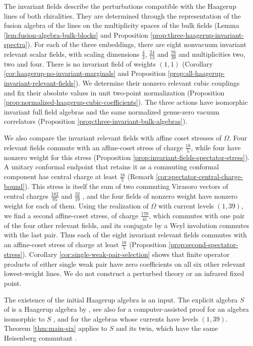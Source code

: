 \documentclass[leqno]{article}
\numberwithin{equation}{section}
\begin{document}
The invariant fields describe the perturbations compatible with the Haagerup lines of both chiralities. They are determined through the representation of the fusion algebra of the lines on the multiplicity spaces of the bulk fields (Lemma \ref{lem:fusion-algebra-bulk-blocks} and Proposition \ref{prop:three-haagerup-invariant-spectra}). For each of the three embeddings, there are eight nonvacuum invariant relevant scalar fields, with scaling dimensions $\frac43$, $\frac{24}{13}$ and $\frac{76}{39}$ and multiplicities two, two and four. There is no invariant field of weights $(1,1)$ (Corollary \ref{cor:haagerup-no-invariant-marginals} and Proposition \ref{prop:all-haagerup-invariant-relevant-fields}). We determine their nonzero relevant cubic couplings and fix their absolute values in unit two-point normalization (Proposition \ref{prop:normalized-haagerup-cubic-coefficients}). The three actions have isomorphic invariant full field algebras and the same normalized genus-zero vacuum correlators (Proposition \ref{prop:three-invariant-bulk-algebras}).

We also compare the invariant relevant fields with affine coset stresses of $\Omega$. Four relevant fields commute with an affine-coset stress of charge $\frac{18}{5}$, while four have nonzero weight for this stress (Proposition \ref{prop:invariant-fields-spectator-stress}). A unitary conformal endpoint that retains it as a commuting conformal component has central charge at least $\frac{18}{5}$ (Remark \ref{cor:spectator-central-charge-bound}). This stress is itself the sum of two commuting Virasoro vectors of central charges $\frac{182}{95}$ and $\frac{32}{19}$ \cite[Theorem 10.5 p.~30]{Arh26a}, and the four fields of nonzero weight have nonzero weight for each of them. Using the realization of $\Omega$ with current levels $(1,39)$, we find a second affine-coset stress, of charge $\frac{170}{41}$, which commutes with one pair of the four other relevant fields, and its conjugate by a Weyl involution commutes with the last pair. Thus each of the eight invariant relevant fields commutes with an affine-coset stress of charge at least $\frac{18}{5}$ (Proposition \ref{prop:second-spectator-stress}). Corollary \ref{cor:single-weak-pair-selection} shows that finite operator products of either single weak pair have zero coefficients on all six other relevant lowest-weight lines. We do not construct a perturbed theory or an infrared fixed point.

The existence of the initial Haagerup algebra is an input. The explicit algebra $S$ of \cite[Theorem 10.10 p.~33]{Arh26a} is a Haagerup algebra by \cite[Theorem 6.1 p.~25]{Arh26c}, see also \cite{Jia26} for a computer-assisted proof for an algebra isomorphic to $S$ \cite[Theorem 10.24 p.~42]{Arh26a}, and \cite{Hua26,Rie26,DJX26} for the algebras whose currents have levels $(1,39)$. Theorem \ref{thm:main-six} applies to $S$ and its twin, which have the same Heisenberg commutant \cite[Theorem 12.3(1) p.~64]{Arh26a}.
\end{document}
